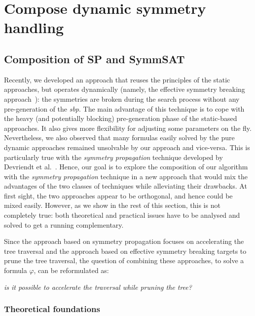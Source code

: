 \chapter{Compose dynamic symmetry handling}


\section{Composition of SP and SymmSAT}

Recently, we developed an approach that reuses the
principles of the static approaches, but operates dynamically (namely, the effective symmetry breaking approach~\cite{metin2018cdclsym}):
 the symmetries are broken during the search process without any pre-generation of the \textit{sbp}. The main
advantage of this technique is to cope with the heavy (and potentially
blocking) pre-generation phase of the static-based approaches. It also gives
more flexibility for adjusting some parameters on the fly. 
Nevertheless, we also observed that many formulas easily solved by the pure
dynamic approaches remained unsolvable by our approach and vice-versa. This is
particularly true with the \textit{symmetry propagation} technique developed by
Devriendt et al.~\cite{Devriendt12}.
Hence, our goal is to explore the composition of our algorithm with the  \textit{symmetry propagation} technique in
a new approach that would mix the advantages of the two classes of techniques while alleviating their drawbacks. At first sight,
the two approaches appear to be orthogonal, and hence could be mixed easily. However, as we show in the rest of this section,
this is not completely true: both theoretical and practical issues have to be analysed and solved to get a
running complementary. 


Since the approach based on symmetry propagation focuses on
accelerating the tree traversal and the approach based on effective symmetry
breaking targets to prune the tree traversal, the question of combining these approaches, to solve a formula $\varphi$, can
be reformulated as: 

\begin{center}
	\textit{is it possible to accelerate the traversal while pruning the tree?}
\end{center}


\subsection{Theoretical foundations}
\label{sec:tf}

